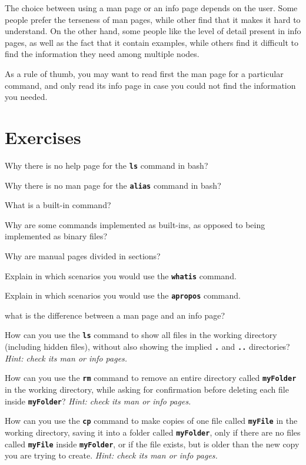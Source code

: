 The choice between using a man page or an info page depends on the user. Some people prefer the terseness of man pages, while other find that it makes it hard to understand. On the other hand, some people like the level of detail present in info pages, as well as the fact that it contain examples, while others find it difficult to find the information they need among multiple nodes.

As a rule of thumb, you may want to read first the man page for a particular command, and only read its info page in case you could not find the information you needed.

\section*{Exercises}

\begin{exercises}
  \item Why there is no help page for the \textbf{\texttt{ls}} command in bash?
  \item Why there is no man page for the \textbf{\texttt{alias}} command in bash?
  \item What is a built-in command?
  \item Why are some commands implemented as built-ins, as opposed to being implemented as binary files?
  \item Why are manual pages divided in sections?
  \item Explain in which scenarios you would use the \textbf{\texttt{whatis}} command.
  \item Explain in which scenarios you would use the \textbf{\texttt{apropos}} command.
  \item what is the difference between a man page and an info page?
  \item How can you use the \textbf{\texttt{ls}} command to show all files in the working directory (including hidden files), without also showing the implied \textbf{\texttt{.}} and \textbf{\texttt{..}} directories? \textit{Hint: check its man or info pages.}
  \item How can you use the \textbf{\texttt{rm}} command to remove an entire directory called \textbf{\texttt{myFolder}} in the working directory, while asking for confirmation before deleting each file inside \textbf{\texttt{myFolder}}? \textit{Hint: check its man or info pages.}
  \item How can you use the \textbf{\texttt{cp}} command to make copies of one file called \textbf{\texttt{myFile}} in the working directory, saving it into a folder called \textbf{\texttt{myFolder}}, only if there are no files called \textbf{\texttt{myFile}} inside \textbf{\texttt{myFolder}}, or if the file exists, but is older than the new copy you are trying to create. \textit{Hint: check its man or info pages.}
\end{exercises}
